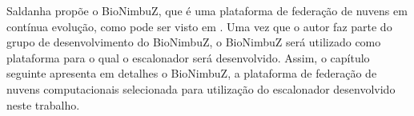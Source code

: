 Saldanha \cite{Saldanha_BioNimbus} propõe o BioNimbuZ, que é uma plataforma de federação de nuvens em contínua evolução, como pode ser visto em \cite{BioNimbuZ_Breno_Deric} \cite{BioNimbuZ_Closer} \cite{BioNimbuZ_6846526} \cite{6732620_BioNimbuZ_ACOsched} \cite{BioNimbuZ_Willian_C99} \cite{closer12_BioNimbuZ_AHP}. Uma vez que o autor faz parte do grupo de desenvolvimento do BioNimbuZ, o BioNimbuZ será utilizado como plataforma para o qual o escalonador será desenvolvido. Assim, o capítulo seguinte apresenta em detalhes o BioNimbuZ, a plataforma de federação de nuvens computacionais selecionada para utilização do escalonador desenvolvido neste trabalho.

